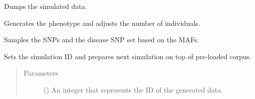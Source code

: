 \documentclass[a4paper,10pt,english]{sphinxhowto}
\begin{document}
\begin{fulllineitems}
\begin{fulllineitems}
\begin{quote}
\begin{description}
\begin{itemize}
\end{itemize}

\end{description}\end{quote}

\end{fulllineitems}


\begin{fulllineitems}
\label{\detokenize{utils:utils.data_simulator.DataSimulator.dump_simulated_data}}
Dumps the simulated data.

\end{fulllineitems}


\begin{fulllineitems}
\label{\detokenize{utils:utils.data_simulator.DataSimulator.generate_phenotype}}
Generates the phenotype and adjusts the number of individuals.

\end{fulllineitems}


\begin{fulllineitems}
\label{\detokenize{utils:utils.data_simulator.DataSimulator.sample_snps}}
Samples the SNPs and the disease SNP set based on the MAFs.

\end{fulllineitems}


\begin{fulllineitems}
\label{\detokenize{utils:utils.data_simulator.DataSimulator.set_sim_id}}
Sets the simulation ID and prepares next simulation on top of pre-loaded corpus.
\begin{quote}\begin{description}
\item[{Parameters}] \leavevmode
{} () \textendash{} An integer that represents the ID of the generated data.


\end{description}
\end{quote}
\end{fulllineitems}
\end{fulllineitems}
\end{document}
